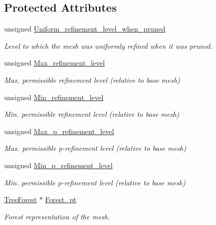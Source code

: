 \subsection*{Protected Attributes}
\begin{DoxyCompactItemize}
\item 
unsigned \hyperlink{classoomph_1_1TreeBasedRefineableMeshBase_a1a69da6d99f1776f53209940d40eaaa3}{Uniform\+\_\+refinement\+\_\+level\+\_\+when\+\_\+pruned}
\begin{DoxyCompactList}\small\item\em Level to which the mesh was uniformly refined when it was pruned. \end{DoxyCompactList}\item 
unsigned \hyperlink{classoomph_1_1TreeBasedRefineableMeshBase_acd1c5544779f42de66b25a0225644f7d}{Max\+\_\+refinement\+\_\+level}
\begin{DoxyCompactList}\small\item\em Max. permissible refinement level (relative to base mesh) \end{DoxyCompactList}\item 
unsigned \hyperlink{classoomph_1_1TreeBasedRefineableMeshBase_af48df64966833ed693c11576ff28ada1}{Min\+\_\+refinement\+\_\+level}
\begin{DoxyCompactList}\small\item\em Min. permissible refinement level (relative to base mesh) \end{DoxyCompactList}\item 
unsigned \hyperlink{classoomph_1_1TreeBasedRefineableMeshBase_a39ab498ac06506e1500f9f03e8cecf72}{Max\+\_\+p\+\_\+refinement\+\_\+level}
\begin{DoxyCompactList}\small\item\em Max. permissible p-\/refinement level (relative to base mesh) \end{DoxyCompactList}\item 
unsigned \hyperlink{classoomph_1_1TreeBasedRefineableMeshBase_abd9b33d333c11837b3d2dbca163b6320}{Min\+\_\+p\+\_\+refinement\+\_\+level}
\begin{DoxyCompactList}\small\item\em Min. permissible p-\/refinement level (relative to base mesh) \end{DoxyCompactList}\item 
\hyperlink{classoomph_1_1TreeForest}{Tree\+Forest} $\ast$ \hyperlink{classoomph_1_1TreeBasedRefineableMeshBase_aaf121b2595ff71815c4e9db35247f951}{Forest\+\_\+pt}
\begin{DoxyCompactList}\small\item\em Forest representation of the mesh. \end{DoxyCompactList}\end{DoxyCompactItemize}
